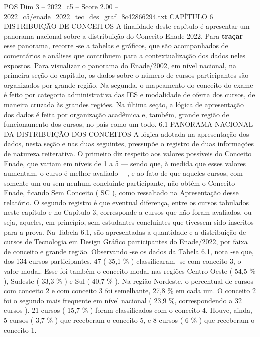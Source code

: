 \begin{textsample}{POS Dim 3 – 2022\_c5 – Score 2.00 – 2022\_c5/enade\_2022\_tec\_des\_graf\_8c42866294.txt}  \label{ex:f3_pos_067}
CAPÍTULO 6 DISTRIBUIÇÃO DE CONCEITOS A finalidade deste capítulo é apresentar um panorama nacional sobre a distribuição do Conceito Enade 2022.
Para \textbf{traçar} esse panorama, recorre -se a tabelas e gráficos, que são acompanhados de comentários e análises que contribuem para a contextualização dos dados neles expostos.
Para visualizar o panorama do Enade/2002, em nível nacional, na primeira seção do capítulo, os dados sobre o número de cursos participantes são organizados por grande região.
Na segunda, o mapeamento do conceito do exame é feito por categoria administrativa das IES e modalidade de oferta dos cursos, de maneira cruzada às grandes regiões.
Na última seção, a lógica de apresentação dos dados é feita por organização acadêmica e, também, grande região de funcionamento dos cursos, no país como um todo. 6.1 PANORAMA NACIONAL DA DISTRIBUIÇÃO DOS CONCEITOS A lógica adotada na apresentação dos dados, nesta seção e nas duas seguintes, pressupõe o registro de duas informações de natureza reiterativa.
O primeiro diz respeito aos valores possíveis do Conceito Enade, que variam em níveis de 1 a 5 — sendo que, à medida que esses valores aumentam, o curso é melhor avaliado —, e ao fato de que aqueles cursos, com somente um ou sem nenhum concluinte participante, não obtêm o Conceito Enade, ficando Sem Conceito ( SC ), como ressaltado na Apresentação desse relatório.
O segundo registro é que eventual diferença, entre os cursos tabulados neste capítulo e no Capítulo 3, corresponde a cursos que não foram avaliados, ou seja, aqueles, em princípio, sem estudantes concluintes que tivessem sido inscritos para a prova.
Na Tabela 6.1, são apresentadas a quantidade e a distribuição de cursos de Tecnologia em Design Gráfico participantes do Enade/2022, por faixa de conceito e grande região.
Observando -se os dados da Tabela 6.1, nota -se que, dos 134 cursos participantes, 47 ( 35,1 \% ) classificaram -se com conceito 3, o valor modal.
Esse foi também o conceito modal nas regiões Centro-Oeste ( 54,5 \% ), Sudeste ( 33,3 \% ) e Sul ( 40,7 \% ).
Na região Nordeste, o percentual de cursos com conceito 2 e com conceito 3 foi semelhante, 27,8 \% em cada um.
O conceito 2 foi o segundo mais frequente em nível nacional ( 23,9 \%, correspondendo a 32 cursos ). 21 cursos ( 15,7 \% ) foram classificados com o conceito 4.
Houve, ainda, 5 cursos ( 3,7 \% ) que receberam o conceito 5, e 8 cursos ( 6 \% ) que receberam o conceito 1.

\end{textsample}
